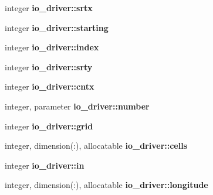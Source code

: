 \begin{DoxyCompactItemize}
\item 
\hypertarget{namespaceio__driver_a4137a00cdd8ceee0cec0a74539ba7344}{}integer {\bfseries io\+\_\+driver\+::srtx}\label{namespaceio__driver_a4137a00cdd8ceee0cec0a74539ba7344}

\item 
\hypertarget{namespaceio__driver_aa0897488f7973e2954f4c54aa50f666a}{}integer {\bfseries io\+\_\+driver\+::starting}\label{namespaceio__driver_aa0897488f7973e2954f4c54aa50f666a}

\item 
\hypertarget{namespaceio__driver_a7bc2c651ce5080ed74bbeb4eef056ad0}{}integer {\bfseries io\+\_\+driver\+::index}\label{namespaceio__driver_a7bc2c651ce5080ed74bbeb4eef056ad0}

\item 
\hypertarget{namespaceio__driver_aeaefe0a3ff1a1f942ca9c24d825ec5dd}{}integer {\bfseries io\+\_\+driver\+::srty}\label{namespaceio__driver_aeaefe0a3ff1a1f942ca9c24d825ec5dd}

\item 
\hypertarget{namespaceio__driver_a791599e5e97596b34ffdb7ac198d477e}{}integer {\bfseries io\+\_\+driver\+::cntx}\label{namespaceio__driver_a791599e5e97596b34ffdb7ac198d477e}

\item 
\hypertarget{namespaceio__driver_a5fbf89a707a4bd6b1419968c90f79b26}{}integer, parameter {\bfseries io\+\_\+driver\+::number}\label{namespaceio__driver_a5fbf89a707a4bd6b1419968c90f79b26}

\item 
\hypertarget{namespaceio__driver_a839c9dfbee195ed2225b66d67496fe89}{}integer {\bfseries io\+\_\+driver\+::grid}\label{namespaceio__driver_a839c9dfbee195ed2225b66d67496fe89}

\item 
\hypertarget{namespaceio__driver_a7e44733fcf2a44baf06c28b85fd9727f}{}integer, dimension(\+:), allocatable {\bfseries io\+\_\+driver\+::cells}\label{namespaceio__driver_a7e44733fcf2a44baf06c28b85fd9727f}

\item 
\hypertarget{namespaceio__driver_a3646dc3b980f550fd9e9998333d3ad58}{}integer {\bfseries io\+\_\+driver\+::in}\label{namespaceio__driver_a3646dc3b980f550fd9e9998333d3ad58}

\item 
\hypertarget{namespaceio__driver_ae1ecf2d4ca02a326735ede13ad79cdf7}{}integer, dimension(\+:), allocatable {\bfseries io\+\_\+driver\+::longitude}\label{namespaceio__driver_ae1ecf2d4ca02a326735ede13ad79cdf7}


\end{DoxyCompactItemize}
